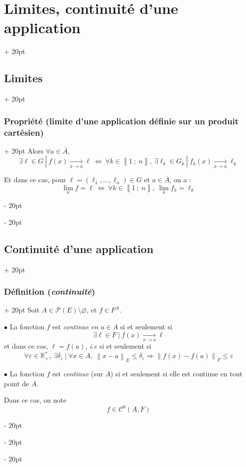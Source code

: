 \documentclass[a4paper, 12pt, twoside]{article}
\newcommand{\R}{\mathbb{R}} %
\newcommand{\nset}[2]{\left\llbracket #1\ ;\ #2 \right\rrbracket}
\newcommand{\cj}[1]{\overline{#1}} %
\newcommand{\tendsto}[1]{\xrightarrow[#1]{}}
\newcommand{\norm}[1]{\left\lVert #1 \right\rVert}
\newcommand{\ssi}{\ \Leftrightarrow \ }
\renewcommand{\le}{\leqslant}
\newcommand{\ind}[1][20pt]{\advance\leftskip + #1}
\newcommand{\deind}[1][20pt]{\advance\leftskip - #1}
\newenvironment{indt}[2][20pt]{#2 \par \ind[#1]}{\par \deind} %
\begin{document}
\begin{indt}{\section{Limites, continuité d'une application}}
\begin{indt}{\subsection{Limites}}
\begin{indt}{\subsubsection{Propriété (limite d'une application définie sur un produit cartésien)}}
                Alors $\forall a \in \cj A$,
                \[
                    \exists \ell \in G\ |\ f(x) \tendsto{x \to a} \ell
                    \ssi
                    \forall k \in \nset 1 n,\ \exists \ell_k \in G_k\ |\ f_k(x) \tendsto{x \to a} \ell_k
                \]

                Et dans ce cas, pour $\ell = (\ell_1, \ldots, \ell_n) \in G$ et $a \in \cj A$, on a :
                \[
                    \lim_a f = \ell
                    \ssi
                    \forall k \in \nset 1 n,\
                    \lim_a f_k = \ell_k
                \]
            \end{indt}
        \end{indt}

        \vspace{12pt}
        
        \begin{indt}{\subsection{Continuité d'une application}}
            \begin{indt}{\subsubsection{Définition (\textit{continuité})}}
                Soit $A \in \mathcal P(E) \setminus \varnothing$, et $f \in F^A$.

                \vspace{6pt}
                
                $\bullet$ La fonction $f$ est \emph{continue en $a \in A$} si et seulement si
                \[
                    \exists \ell \in F\ |\ f(x) \tendsto{x \to a} \ell
                \]
                et dans ce cas, $\ell = f(a)$, \textit{i.e} si et seulement si
                \[
                    \forall \varepsilon \in \R^*_+,\
                    \exists \delta_\varepsilon\ |\
                    \forall x \in A,\
                    \norm{x - a}_E \le \delta_\varepsilon \Rightarrow \norm{f(x) - f(a)}_F \le \varepsilon
                \]

                \vspace{6pt}
                
                $\bullet$ La fonction $f$ est \emph{continue} (sur $A$) si et seulement si elle est continue en tout point de $A$.

                Dans ce cas, on note
                \[
                    f \in \mathcal C^0(A, F)
                \]
            \end{indt}


\end{indt}
\end{indt}
\end{document}
